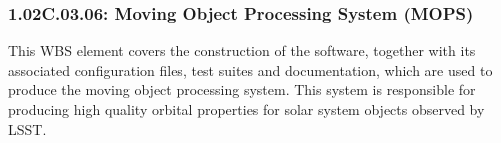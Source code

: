 \subsubsection*{1.02C.03.06: Moving Object Processing System (MOPS)}

This WBS element covers the construction of the software, together with
its associated configuration files, test suites and documentation, which
are used to produce the moving object processing system.  This system is
responsible for producing high quality orbital properties for solar
system objects observed by LSST.
